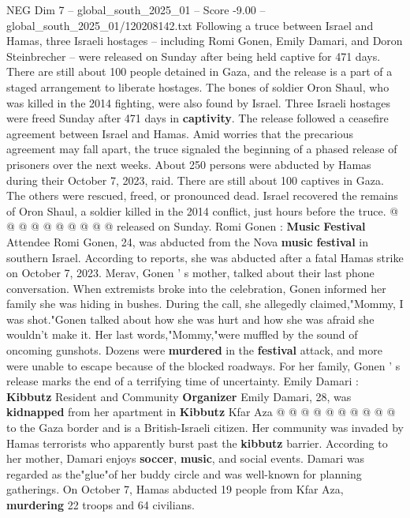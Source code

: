 \begin{textsample}{NEG Dim 7 – global\_south\_2025\_01 – Score -9.00 – global\_south\_2025\_01/120208142.txt}  \label{ex:f7_neg_192}
Following a truce between Israel and Hamas, three Israeli hostages -- including Romi Gonen, Emily Damari, and Doron Steinbrecher -- were released on Sunday after being held captive for 471 days.
There are still about 100 people detained in Gaza, and the release is a part of a staged arrangement to liberate hostages.
The bones of soldier Oron Shaul, who was killed in the 2014 fighting, were also found by Israel.
Three Israeli hostages were freed Sunday after 471 days in \textbf{captivity}.
The release followed a ceasefire agreement between Israel and Hamas.
Amid worries that the precarious agreement may fall apart, the truce signaled the beginning of a phased release of prisoners over the next weeks.
About 250 persons were abducted by Hamas during their October 7, 2023, raid.
There are still about 100 captives in Gaza.
The others were rescued, freed, or pronounced dead.
Israel recovered the remains of Oron Shaul, a soldier killed in the 2014 conflict, just hours before the truce. @ @ @ @ @ @ @ @ @ @ released on Sunday.
Romi Gonen : \textbf{Music} \textbf{Festival} Attendee Romi Gonen, 24, was abducted from the Nova \textbf{music} \textbf{festival} in southern Israel.
According to reports, she was abducted after a fatal Hamas strike on October 7, 2023.
Merav, Gonen ' s mother, talked about their last phone conversation.
When extremists broke into the celebration, Gonen informed her family she was hiding in bushes.
During the call, she allegedly claimed,"Mommy, I was shot."Gonen talked about how she was hurt and how she was afraid she wouldn't make it.
Her last words,"Mommy,"were muffled by the sound of oncoming gunshots.
Dozens were \textbf{murdered} in the \textbf{festival} attack, and more were unable to escape because of the blocked roadways.
For her family, Gonen ' s release marks the end of a terrifying time of uncertainty.
Emily Damari : \textbf{Kibbutz} Resident and Community \textbf{Organizer} Emily Damari, 28, was \textbf{kidnapped} from her apartment in \textbf{Kibbutz} Kfar Aza @ @ @ @ @ @ @ @ @ @ to the Gaza border and is a British-Israeli citizen.
Her community was invaded by Hamas terrorists who apparently burst past the \textbf{kibbutz} barrier.
According to her mother, Damari enjoys \textbf{soccer}, \textbf{music}, and social events.
Damari was regarded as the"glue"of her buddy circle and was well-known for planning gatherings.
On October 7, Hamas abducted 19 people from Kfar Aza, \textbf{murdering} 22 troops and 64 civilians.

\end{textsample}
